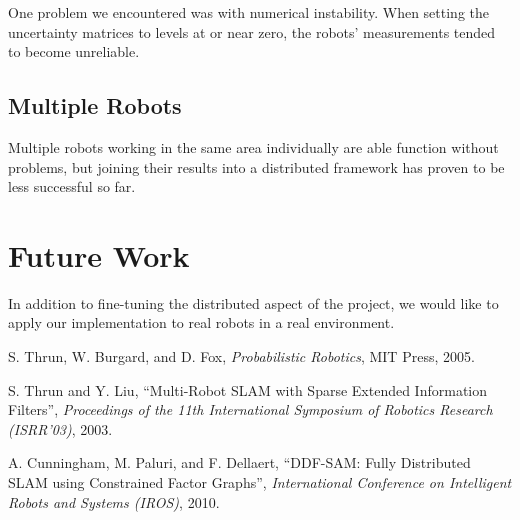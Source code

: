 \documentclass[prodmode,acmtecs]{acmsmall} %
\begin{document}
One problem we encountered was with numerical instability.  When setting the uncertainty matrices to levels at or near zero, the robots' measurements tended to become unreliable.  

\subsection{Multiple Robots}

Multiple robots working in the same area individually are able function without problems, but joining their results into a distributed framework has proven to be less successful so far.



\section{Future Work}

In addition to fine-tuning the distributed aspect of the project, we would like to apply our implementation to real robots in a real environment.

\begin{thebibliography}{12}
        S. Thrun, W. Burgard, and D. Fox, \emph{Probabilistic Robotics}, MIT Press, 2005.

        S. Thrun and Y. Liu, ``Multi-Robot SLAM with Sparse Extended Information Filters'', \emph{Proceedings of the 11th International Symposium of Robotics Research (ISRR'03)}, 2003.

        A. Cunningham, M. Paluri, and F. Dellaert, ``DDF-SAM: Fully Distributed SLAM using Constrained Factor Graphs'', \emph{International Conference on Intelligent Robots and Systems (IROS)}, 2010.

\end{thebibliography}
\end{document}
